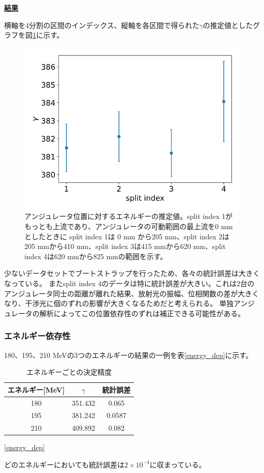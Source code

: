 \documentclass[a4paper,11pt,uplatex]{jsbook}
\begin{document}
\noindent \textbf{\underline{結果}}\par
横軸を4分割の区間のインデックス、縦軸を各区間で得られた$\gamma$の推定値としたグラフを図\ref{posdep}に示す。
\begin{figure}[h]
  \centering
  \includegraphics[width=0.8\linewidth]{image/4-posdep.png}
  \caption[アンジュレータ位置に対するエネルギーの推定値]{アンジュレータ位置に対するエネルギーの推定値。split index 1がもっとも上流であり、アンジュレータの可動範囲の最上流を0 mm としたときに
  split index 1は 0 mm から205 mm、split index 2は205 mmから410 mm、split index 3は415 mmから620 mm、split index 4は620 mmから825 mmの範囲を示す。}\label{posdep}
\end{figure}
少ないデータセットでブートストラップを行ったため、各々の統計誤差は大きくなっている。
またsplit index 4のデータは特に統計誤差が大きい。これは2台のアンジュレータ同士の距離が離れた結果、放射光の振幅、位相関数の差が大きくなり、干渉光に個のずれの影響が大きくなるためだと考えられる。
単独アンジュレータの解析によってこの位置依存性のずれは補正できる可能性がある。

\subsubsection{エネルギー依存性}
180、195、210 MeVの3つのエネルギーの結果の一例を表\ref{energy_dep}に示す。
\begin{table}
\begin{tabular}{c|c|c}
  エネルギー[MeV] & $\gamma$ & 統計誤差 \\
  \hline
  180 & 351.432 & 0.065 \\
  195 & 381.242 & 0.0587 \\
  210 & 409.892 & 0.082 \\
\end{tabular}\caption{エネルギーごとの決定精度}\ref{energy_dep}
\end{table}
どのエネルギーにおいても統計誤差は$2\times10^{-4}$に収まっている。
\end{document}
